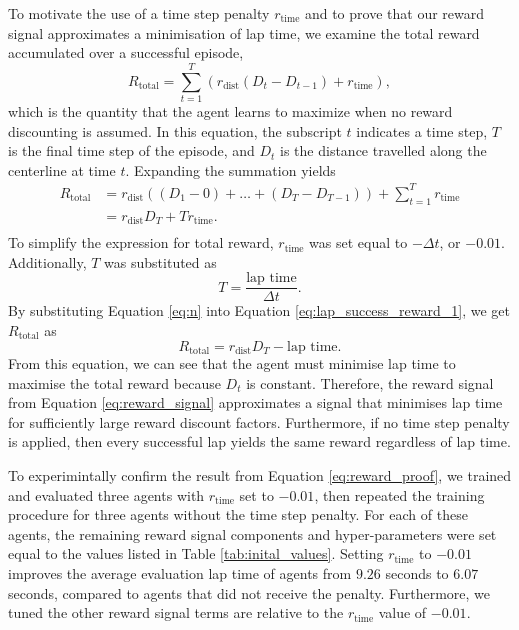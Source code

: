 To motivate the use of a time step penalty $r_{\text{time}}$ and to prove that our reward signal approximates a minimisation of lap time, we examine the total reward accumulated over a successful episode, 
\begin{equation}
        R_{\text{total}} =  \sum_{t=1}^{T} \left( r_{\text{dist}}(D_{t}-D_{t-1})+r_{\text{time}} \right),
\label{eq:lap_success_reward}
\end{equation}
which is the quantity that the agent learns to maximize when no reward discounting is assumed. 
In this equation, the subscript $t$ indicates a time step, $T$ is the final time step of the episode, and $D_t$ is the distance travelled along the centerline at time $t$.
Expanding the summation yields
\begin{equation}
    \begin{split}
        R_{\text{total}}
        &= r_{\text{dist}} \left( (D_1-0) + \ldots + (D_{T} - D_{T-1}) \right) + \sum_{t=1}^{T} r_{\text{time}} \\
        &= r_{\text{dist}} D_T  + T r_{\text{time}}. \\
    \end{split}
\label{eq:lap_success_reward_1}
\end{equation}
To simplify the expression for total reward, $r_{\text{time}}$ was set equal to $-\Delta t$, or $-0.01$.
Additionally, $T$ was substituted as
\begin{equation}
T=\frac{\text{lap time}}{\Delta t}.
\label{eq:n}
\end{equation}
By substituting Equation \ref{eq:n} into Equation \ref{eq:lap_success_reward_1}, we get $R_{\text{total}}$ as
\begin{equation}\label{eq:reward_proof}
    R_{\text{total}} = r_{\text{dist}} D_T - \text{lap time}.
\end{equation}
From this equation, we can see that the agent must minimise lap time to maximise the total reward because $D_t$ is constant.
Therefore, the reward signal from Equation \ref{eq:reward_signal} approximates a signal that minimises lap time for sufficiently large reward discount factors.
Furthermore, if no time step penalty is applied, then every successful lap yields the same reward regardless of lap time.

To experimintally confirm the result from Equation \ref{eq:reward_proof}, we trained and evaluated three agents with $r_{\text{time}}$ set to $-0.01$, then repeated the training procedure for three agents without the time step penalty.
For each of these agents, the remaining reward signal components and hyper-parameters were set equal to the values listed in Table \ref{tab:inital_values}.
Setting $r_{\text{time}}$ to $-0.01$ improves the average evaluation lap time of agents from $9.26$ seconds to $6.07$ seconds, compared to agents that did not receive the penalty.
Furthermore, we tuned the other reward signal terms are relative to the $r_{\text{time}}$ value of $-0.01$.



